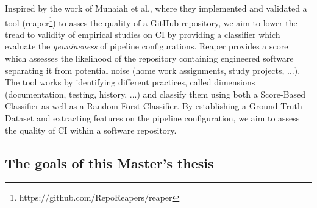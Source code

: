 \documentclass{task_description}
\begin{document}
Inspired by the work of Munaiah et al.\cite{munaiah2017curating}, where they implemented and validated a tool (reaper\footnote{https://github.com/RepoReapers/reaper}) to asses the quality of a GitHub repository, we aim to lower the tread to validity of empirical studies on CI by providing a classifier which evaluate the \textit{genuineness} of pipeline configurations. Reaper provides a score which assesses the likelihood of the repository containing engineered software separating it from potential noise (\eg home work assignments, study projects, ...). The tool works by identifying different practices, called dimensions (\eg documentation, testing, history, ...) and classify them using both a Score-Based Classifier as well as a Random Forst Classifier. By establishing a Ground Truth Dataset and extracting features on the pipeline configuration, we aim to assess the quality of CI within a software repository.

\subsection*{The goals of this Master's thesis}
\end{document}
